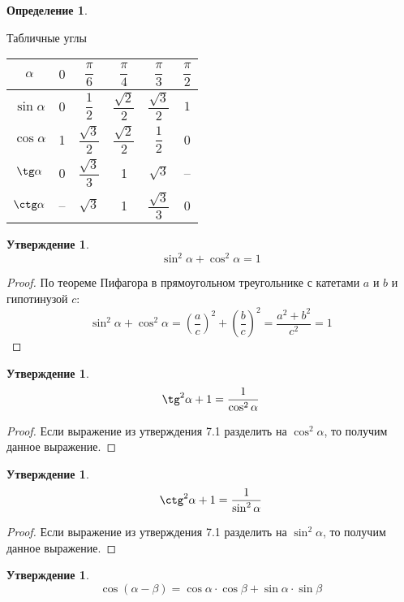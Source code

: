 \documentclass[12pt]{article}
\theoremstyle{definition}
\newtheorem{definition}{Определение}
\newtheorem{statement}[theorem]{Утверждение}
\begin{document}
\begin{definition}
    $ $\newline
    \begin{center}
        Табличные углы\\
        $ $\newline
        \def\arraystretch{2.3}
        \begin{tabular}{cccccc}
            \toprule
            $\alpha$&$0$&$\dfrac{\pi}{6}$&$\dfrac{\pi}{4}$&$\dfrac{\pi}{3}$&$\dfrac{\pi}{2}$\\
            \midrule
            $\sin \alpha$&0&$\dfrac{1}{2}$&$\dfrac{\sqrt{2}}{2}$&$\dfrac{\sqrt{3}}{2}$&$1$\\
            $\cos \alpha$&1&$\dfrac{\sqrt{3}}{2}$&$\dfrac{\sqrt{2}}{2}$&$\dfrac{1}{2}$&0\\
            $\tg \alpha$&0&$\dfrac{\sqrt{3}}{3}$&1&$\sqrt{3}$&--\\
            $\ctg \alpha$&--&$\sqrt{3}$&1&$\dfrac{\sqrt{3}}{3}$&0\\
            \bottomrule
           \end{tabular}
    \end{center}
\end{definition}
\begin{statement}
    $$\sin^2 \alpha + \cos^2 \alpha=1$$
\end{statement}
\begin{proof}
    По теореме Пифагора в прямоугольном треугольнике с катетами $a$ и $b$ и гипотинузой $c$:
    $$\sin^2 \alpha + \cos^2 \alpha=\left(\dfrac{a}{c}\right)^2+\left(\dfrac{b}{c}\right)^2=\dfrac{a^2 + b^2}{c^2}=1$$
\end{proof}
\begin{statement}
    $$\tg^2\alpha + 1=\dfrac{1}{\cos^2 \alpha}$$
\end{statement}
\begin{proof}
    Если выражение из утверждения 7.1 разделить на $\cos^2 \alpha$, то получим данное выражение.
\end{proof}
\begin{statement}
    $$\ctg^2\alpha + 1=\dfrac{1}{\sin^2 \alpha}$$
\end{statement}
\begin{proof}
    Если выражение из утверждения 7.1 разделить на $\sin^2 \alpha$, то получим данное выражение.
\end{proof}
\begin{statement}
    $$\cos(\alpha - \beta)=\cos\alpha\cdot\cos\beta+\sin\alpha\cdot\sin\beta$$
\end{statement}
\end{document}
